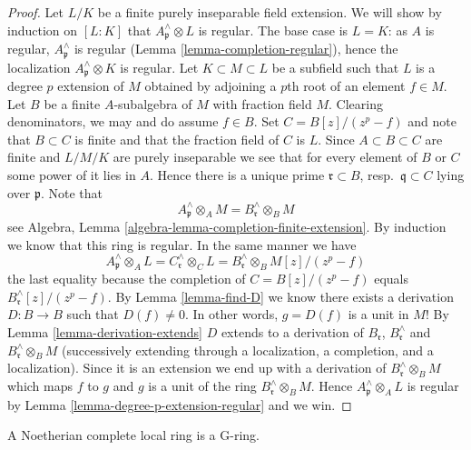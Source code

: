 \begin{proof}
Let $L/K$ be a finite purely inseparable field extension.
We will show by induction on $[L : K]$ that $A_\mathfrak p^\wedge \otimes L$
is regular. The base case is $L = K$: as $A$ is regular,
$A_\mathfrak p^\wedge$ is regular (Lemma \ref{lemma-completion-regular}),
hence the localization $A_\mathfrak p^\wedge \otimes K$ is regular.
Let $K \subset M \subset L$ be a subfield such that
$L$ is a degree $p$ extension of $M$ obtained by adjoining a $p$th root
of an element $f \in M$. Let $B$ be a finite $A$-subalgebra
of $M$ with fraction field $M$. Clearing denominators, we may and do assume
$f \in B$. Set $C = B[z]/(z^p -f)$ and note that $B \subset C$
is finite and that the fraction field of $C$ is $L$. Since
$A \subset B \subset C$ are finite and $L/M/K$ are purely
inseparable we see that for every element of $B$ or $C$ some power of
it lies in $A$. Hence there is a unique prime $\mathfrak r \subset B$,
resp.\ $\mathfrak q \subset C$ lying over $\mathfrak p$. Note that
$$
A_\mathfrak p^\wedge \otimes_A M = B_\mathfrak r^\wedge \otimes_B M
$$
see Algebra, Lemma \ref{algebra-lemma-completion-finite-extension}.
By induction we know that this ring is regular. In the same manner we have
$$
A_\mathfrak p^\wedge \otimes_A L =
C_\mathfrak r^\wedge \otimes_C L =
B_\mathfrak r^\wedge \otimes_B M[z]/(z^p - f)
$$
the last equality because the completion of
$C = B[z]/(z^p - f)$ equals $B_\mathfrak r^\wedge[z]/(z^p -f)$.
By Lemma \ref{lemma-find-D} we know there exists a derivation
$D : B \to B$ such that $D(f) \not = 0$. In other words, $g = D(f)$
is a unit in $M$! By Lemma \ref{lemma-derivation-extends}
$D$ extends to a derivation of $B_\mathfrak r$, $B_\mathfrak r^\wedge$
and $B_\mathfrak r^\wedge \otimes_B M$ (successively extending through a
localization, a completion, and a localization). Since it is an
extension we end up with a derivation of $B_\mathfrak r^\wedge \otimes_B M$
which maps $f$ to $g$ and $g$ is a unit of the ring
$B_\mathfrak r^\wedge \otimes_B M$.
Hence $A_\mathfrak p^\wedge \otimes_A L$ is regular by
Lemma \ref{lemma-degree-p-extension-regular} and we win.
\end{proof}

\begin{proposition}
\label{proposition-Noetherian-complete-G-ring}
A Noetherian complete local ring is a G-ring.
\end{proposition}

